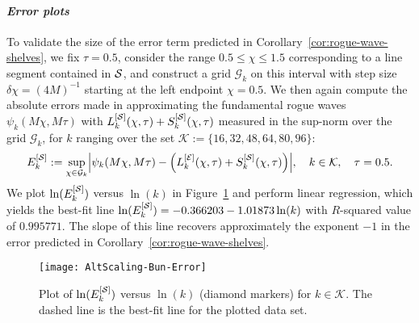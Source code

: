 \paragraph{\textit{Error plots}} To validate the size of the error term predicted in Corollary~\ref{cor:rogue-wave-shelves}, we fix $\tau=0.5$, consider the range $0.5 \leq \chi \leq 1.5$ corresponding to a line segment contained in $\mathcal{S}$, and construct a grid $\mathcal{G}_k$ on this interval with step size $\delta \chi = (4M)^{-1}$ starting at the left endpoint $\chi=0.5$. 
We then again compute the absolute errors made in approximating the fundamental rogue waves  $\psi_k(M\chi,M\tau)$ with $L_k^{[\mathcal{S}]}(\chi,\tau) + S_k^{[\mathcal{S}]}(\chi,\tau)$ measured in the sup-norm over the grid $\mathcal{G}_k$, for $k$ ranging over the set $\mathcal{K} := \{16, 32, 48, 64, 80, 96 \}$:
\begin{equation}
E_k^{[\shelves]}:= \sup_{\chi \in \mathcal{G}_k} \left| \psi_{k}(M\chi,M\tau) - \left( L_k^{[\exterior]}(\chi,\tau) + S_k^{[\shelves]}(\chi,\tau) \right)\right|, \quad k\in\mathcal{K},\quad \tau=0.5.
\end{equation}
We plot $\ln(E_k^{[\mathcal{S}]})$ versus $\ln(k)$ in Figure~\ref{f:shelves-errors} and perform linear regression, which yields the best-fit line $\ln(E_k^{[\mathcal{S}]}) =-0.366203 - 1.01873 \ln(k)$ with $R$-squared value of $0.995771$. The slope of this line recovers approximately the exponent $-1$ in the error predicted in Corollary~\ref{cor:rogue-wave-shelves}.
\begin{figure}[h]
\texttt{[image: AltScaling-Bun-Error]}
\caption{Plot of $\ln(E_k^{[\mathcal{S}]})$ versus $\ln(k)$ (diamond markers) for $k\in\mathcal{K}$. The dashed line is the best-fit line for the plotted data set.}
\label{f:shelves-errors}
\end{figure}

